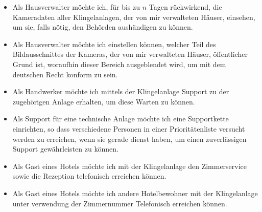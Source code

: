 \begin{itemize}
\begin{description}
        \end{description}
    \item Als Hausverwalter möchte ich, für bis zu $n$ Tagen rückwirkend, die Kameradaten aller Klingelanlagen, der von mir verwalteten Häuser, einsehen, um sie, falls nötig, den Behörden aushändigen zu können.
    \item Als Hausverwalter möchte ich einstellen können, welcher Teil des Bildausschnittes der Kameras, der von mir verwalteten Häuser, öffentlicher Grund ist, woraufhin dieser Bereich ausgeblendet wird, um mit dem deutschen Recht konform zu sein.
    \item Als Handwerker möchte ich mittels der Klingelanlage Support zu der zugehörigen Anlage erhalten, um diese Warten zu können.
    \item Als Support für eine technische Anlage möchte ich eine Supportkette einrichten, so dass verschiedene Personen in einer Prioritätenliste versucht werden zu erreichen, wenn sie gerade dienst haben, um einen zuverlässigen Support gewährleisten zu können.
    \item Als Gast eines Hotels möchte ich mit der Klingelanlage den Zimmerservice sowie die Rezeption telefonisch erreichen können.
    \item Als Gast eines Hotels möchte ich andere Hotelbewohner mit der Klingelanlage unter verwendung der Zimmernummer Telefonisch erreichen können.
\end{itemize}